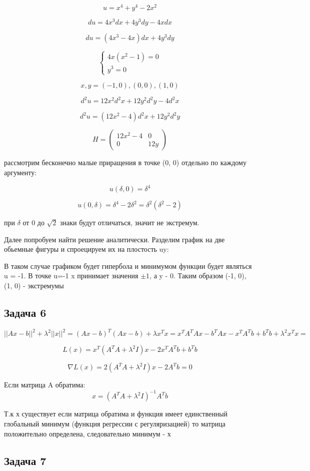 \documentclass[a4paper,12pt]{article}
\begin{document}
\[
u = x^4+y^4-2x^2
\]

\[
du = 4x^3dx +4y^3dy-4xdx
\]

\[
du = (4x^3-4x)dx+4y^3dy
\]

\[
\begin{cases}
	4x(x^2-1) = 0 \\
	y^3=0
\end{cases}
\]

\[
x, y = (-1, 0), (0, 0), (1, 0)
\]

\[
d^2u = 12x^2d^2x+12y^2d^2y-4d^2x
\]

\[
d^2u = (12x^2-4)d^2x + 12y^2d^2y
\]

\[
H = \begin{pmatrix}
	12x^2-4 & 0 \\
	0 & 12y
\end{pmatrix}
\]

рассмотрим бесконечно малые приращения в точке (0, 0) отдельно по каждому аргументу: 

\[
u(\delta, 0) = \delta^4
\]

\[
u(0, \delta) = \delta^4-2\delta^2  = \delta^2(\delta^2-2)
\]

при $\delta$ от 0 до $\sqrt{2}$ знаки будут отличаться, значит не экстремум.

Далее попробуем найти решение аналитически.  Разделим график на две обьемные фигуры и спроецируем их на плостость uy:

В таком случае графиком будет гипербола и минимумом функции будет являться u = -1. В точке u=-1 x принимает значения $\pm 1$, а y - 0. Таким образом (-1, 0), (1, 0) - экстремумы

\subsection{Задача 6}

\[
||Ax-b||^2 +\lambda^2||x||^2= (Ax-b)^T(Ax-b) +\lambda x^Tx= x^TA^TAx-b^TAx-x^TA^Tb+b^Tb +\lambda^2 x^Tx= 
\]

\[
L(x) = x^T(A^TA+\lambda^2I)x-2x^TA^Tb+b^Tb
\]

\[
\nabla L(x) = 2(A^TA+\lambda^2I)x-2A^Tb = 0
\]

Если матрица A обратима:
\[
x = (A^TA+\lambda^2I)^{-1}A^Tb
\]

Т.к х существует если матрица обратима и функция имеет единственный глобальный минимум (функция регрессии с регуляризацией) то матрица положительно определена, следовательно минимум - х

\subsection{Задача 7}	
\end{document}
